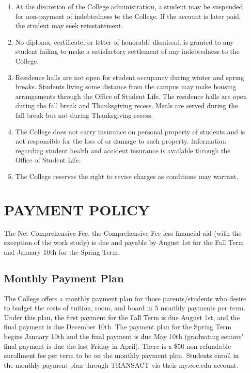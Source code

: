 \documentclass[
  letterpaper,
]{scrbook}
\providecommand{\tightlist}{%
  \setlength{\itemsep}{0pt}\setlength{\parskip}{0pt}}
\begin{document}
\begin{enumerate}
\def\labelenumi{\arabic{enumi}.}
\tightlist
\item
  At the discretion of the College administration, a student may be
  suspended for non-payment of indebtedness to the College. If the
  account is later paid, the student may seek reinstatement.\\
\item
  No diploma, certificate, or letter of honorable dismissal, is granted
  to any student failing to make a satisfactory settlement of any
  indebtedness to the College.\\
\item
  Residence halls are not open for student occupancy during winter and
  spring breaks. Students living some distance from the campus may make
  housing arrangements through the Office of Student Life. The residence
  halls are open during the fall break and Thanksgiving recess. Meals
  are served during the fall break but not during Thanksgiving recess.\\
\item
  The College does not carry insurance on personal property of students
  and is not responsible for the loss of or damage to such property.
  Information regarding student health and accident insurance is
  available through the Office of Student Life.\\
\item
  The College reserves the right to revise charges as conditions may
  warrant.
\end{enumerate}

\section{PAYMENT POLICY}\label{payment-policy}

The Net Comprehensive Fee, the Comprehensive Fee less financial aid
(with the exception of the work study) is due and payable by August 1st
for the Fall Term and January 10th for the Spring Term.

\subsection{Monthly Payment Plan}\label{monthly-payment-plan}

The College offers a monthly payment plan for those parents/students who
desire to budget the costs of tuition, room, and board in 5 monthly
payments per term. Under this plan, the first payment for the Fall Term
is due August 1st, and the final payment is due December 10th. The
payment plan for the Spring Term begins January 10th and the final
payment is due May 10th (graduating seniors' final payment is due the
last Friday in April). There is a \$50 non-refundable enrollment fee per
term to be on the monthly payment plan. Students enroll in the monthly
payment plan through TRANSACT via their my.coe.edu account.
\end{document}

